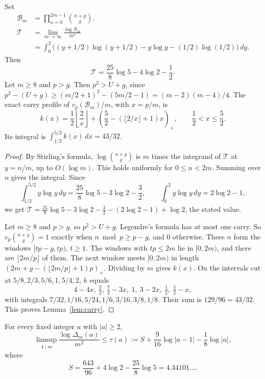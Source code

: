 \begin{lemma}\label{lem:carry}
Set
\[
 \begin{aligned}
 \mathcal B_m&=\prod_{n=0}^{2m-1}\binom{n+g}{g},\\
 \mathcal T&=\lim_{m\to\infty}\frac{\log \mathcal B_m}{m^2}\\
 &=\int_0^2\bigl((y+1/2)\log(y+1/2)-y\log y-(1/2)\log(1/2)\bigr)\,dy.
 \end{aligned}
\]
Then
\[
 \mathcal T=\frac{25}{8}\log5-4\log2-\frac12.
\]
Let \(m\ge8\) and \(p>g\). Then \(p^2>U+g\), since \(p^2-(U+g)\ge(m/2+1)^2-(5m/2-1)=(m-2)(m-4)/4\). The exact carry profile of \(v_p(\mathcal B_m)/m\), with \(x=p/m\), is
\[
 k(x)=\frac12\left\lfloor\frac2x\right\rfloor+
       \left(\frac52-(\lfloor2/x\rfloor+1)x\right)_+,
       \qquad \frac12<x\le\frac52.
\]
Its integral is \(\int_{1/2}^{5/2}k(x)\,dx=43/32\).
\end{lemma}

\begin{proof}
By Stirling's formula, \(\log\binom{n+g}{g}\) is \(m\) times the integrand of \(\mathcal T\) at \(y=n/m\), up to \(O(\log m)\). This holds uniformly for \(0\le n<2m\). Summing over \(n\) gives the integral. Since
\[
 \int_{1/2}^{5/2}y\log y\,dy=\frac{25}8\log5-3\log2-\frac32,\qquad
 \int_0^2y\log y\,dy=2\log2-1,
\]
we get \(\mathcal T=\frac{25}8\log5-3\log2-\frac32-(2\log2-1)+\log2\), the stated value.

Let \(m\ge8\) and \(p>g\), so \(p^2>U+g\). Legendre's formula has at most one carry. So \(v_p\binom{n+g}{g}=1\) exactly when \(n\bmod p\ge p-g\), and \(0\) otherwise. These \(n\) form the windows \([tp-g,tp)\), \(t\ge1\). The windows with \(tp\le2m\) lie in \([0,2m)\), and there are \(\lfloor2m/p\rfloor\) of them. The next window meets \([0,2m)\) in length \((2m+g-(\lfloor2m/p\rfloor+1)p)_+\). Dividing by \(m\) gives \(k(x)\). On the intervals cut at \(5/8,2/3,5/6,1,5/4,2\), \(k\) equals
\[
 4-4x,\ \tfrac32,\ \tfrac72-3x,\ 1,\ 3-2x,\ \tfrac12,\ \tfrac52-x,
\]
with integrals \(7/32,1/16,5/24,1/6,3/16,3/8,1/8\). Their sum is \(129/96=43/32\). This proves Lemma~\ref{lem:carry}.
\end{proof}

\begin{proposition}\label{prop:rate}
For every fixed integer \(a\) with \(|a|\ge2\),
\[
 \limsup_{4\mid m}\frac{\log\Delta_m(a)}{m^2}
 \le \tau(a):=S+\frac9{16}\log|a-1|-\frac18\log|a|,
\]
where
\[
 S=\frac{643}{96}+4\log 2-\frac{25}{8}\log 5
   =4.44101\ldots.
\]
\end{proposition}

